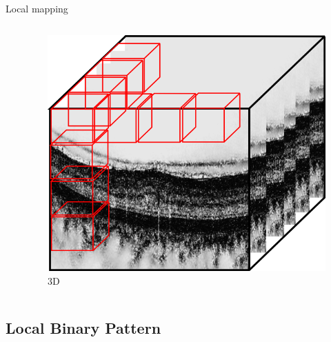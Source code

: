 \documentclass{beamer}
\begin{document}
\begin{frame}
\begin{block}{Local mapping}
\begin{columns}
\begin{column}{.5\linewidth}
      \end{column}
      \begin{column}{.5\linewidth}
        \begin{figure}
          \centering
          \includegraphics[width=.3\textwidth]{./images/local-3d.png}
          \caption{3D}
        \end{figure}
      \end{column}
    \end{columns}
  \end{block}
\end{frame}

\subsection{Local Binary Pattern}
\end{document}
